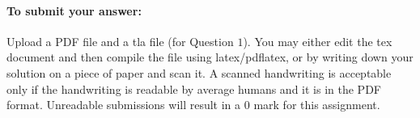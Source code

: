 \documentclass{article}
\begin{document}
\bigskip

\bigskip

\bigskip

\paragraph{To submit your answer:} Upload a PDF file and a tla file (for Question $1$). You may either edit the tex document and then compile the file using latex/pdflatex, or by writing down your solution on a piece of paper and scan it. A scanned handwriting is acceptable only if the handwriting is readable by average humans and it is in the PDF format. Unreadable submissions will result in a $0$ mark for this assignment.
\end{document}
